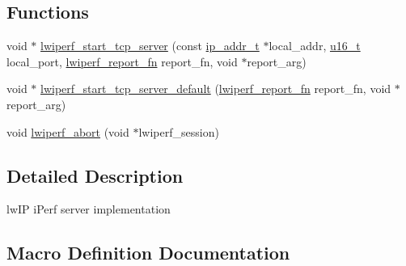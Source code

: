 \subsection*{Functions}
\begin{DoxyCompactItemize}
\item 
void $\ast$ \hyperlink{openmote-cc2538_2lwip_2src_2include_2lwip_2apps_2lwiperf_8h_ad97bf77057e7f96d6d8def812deea202}{lwiperf\+\_\+start\+\_\+tcp\+\_\+server} (const \hyperlink{native_2lwip_2src_2include_2lwip_2ip__addr_8h_a88b43639738c4de2d3cd22e3a1fd7696}{ip\+\_\+addr\+\_\+t} $\ast$local\+\_\+addr, \hyperlink{group__compiler__abstraction_ga77570ac4fcab86864fa1916e55676da2}{u16\+\_\+t} local\+\_\+port, \hyperlink{openmote-cc2538_2lwip_2src_2include_2lwip_2apps_2lwiperf_8h_a248ea47a58a14c6aecf6525217a812fd}{lwiperf\+\_\+report\+\_\+fn} report\+\_\+fn, void $\ast$report\+\_\+arg)
\item 
void $\ast$ \hyperlink{openmote-cc2538_2lwip_2src_2include_2lwip_2apps_2lwiperf_8h_ae1f30a02b86c4dd3d47810cd493baf26}{lwiperf\+\_\+start\+\_\+tcp\+\_\+server\+\_\+default} (\hyperlink{openmote-cc2538_2lwip_2src_2include_2lwip_2apps_2lwiperf_8h_a248ea47a58a14c6aecf6525217a812fd}{lwiperf\+\_\+report\+\_\+fn} report\+\_\+fn, void $\ast$report\+\_\+arg)
\item 
void \hyperlink{openmote-cc2538_2lwip_2src_2include_2lwip_2apps_2lwiperf_8h_ac51c9c44a38bfa1140bd44b793a0a004}{lwiperf\+\_\+abort} (void $\ast$lwiperf\+\_\+session)
\end{DoxyCompactItemize}


\subsection{Detailed Description}
lw\+IP i\+Perf server implementation 

\subsection{Macro Definition Documentation}
\mbox{\label{openmote-cc2538_2lwip_2src_2include_2lwip_2apps_2lwiperf_8h_a911cc7e298ab38433bd4a4980cdcad15}} 

